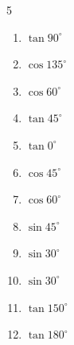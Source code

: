 \begin{multicols}{5}
\begin{enumerate}

  \item $\displaystyle \tan{90^\circ}$

        \phantom{$\displaystyle なし$}

\columnbreak %

  \item $\displaystyle \cos{135^\circ}$


  \item $\displaystyle \cos{60^\circ}$


  \item $\displaystyle \tan{45^\circ}$

        \phantom{$\displaystyle =1$}

  \item $\displaystyle \tan{0^\circ}$

        \phantom{$\displaystyle =0$}

  \item $\displaystyle \cos{45^\circ}$


  \item $\displaystyle \cos{60^\circ}$


  \item $\displaystyle \sin{45^\circ}$


  \item $\displaystyle \sin{30^\circ}$


  \item $\displaystyle \sin{30^\circ}$


  \item $\displaystyle \tan{150^\circ}$


  \item $\displaystyle \tan{180^\circ}$

        \phantom{$\displaystyle =0$}


\end{enumerate}
\end{multicols}
